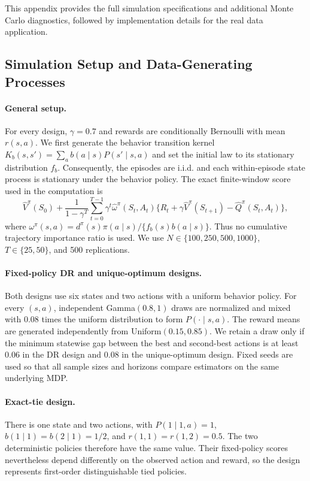 \documentclass[12pt]{article}
\theoremstyle{remark}\newtheorem{remark}[theorem]{Remark}\theoremstyle{plain}
\begin{document}
This appendix provides the full simulation specifications and additional
Monte Carlo diagnostics, followed by implementation details for the real
data application.

\subsection{Simulation Setup and Data-Generating Processes}\label{sec:sim_setup}

\paragraph{General setup.}
For every design, $\gamma=0.7$ and rewards are conditionally Bernoulli
with mean $r(s,a)$.  We first generate the behavior transition kernel
$K_b(s,s')=\sum_a b(a\mid s)P(s'\mid s,a)$ and set the initial law to its
stationary distribution $f_b$.  Consequently, the episodes are i.i.d. and
each within-episode state process is stationary under the behavior policy.
The exact finite-window score used in the computation is
\[
 \widehat V^\pi(S_0)
 +\frac{1}{1-\gamma^T}\sum_{t=0}^{T-1}\gamma^t
 \widehat\omega^\pi(S_t,A_t)
 \{R_t+\gamma\widehat V^\pi(S_{t+1})
                    -\widehat Q^\pi(S_t,A_t)\},
\]
where
$\omega^\pi(s,a)=d^\pi(s)\pi(a\mid s)/\{f_b(s)b(a\mid s)\}$.
Thus no cumulative trajectory importance ratio is used.  We use
$N\in\{100,250,500,1000\}$, $T\in\{25,50\}$, and 500 replications.

\paragraph{Fixed-policy DR and unique-optimum designs.}
Both designs use six states and two actions with a uniform behavior policy.
For every $(s,a)$, independent Gamma$(0.8,1)$ draws are normalized and mixed
with 0.08 times the uniform distribution to form $P(\cdot\mid s,a)$.
The reward means are generated independently from
Uniform$(0.15,0.85)$.  We retain a draw only if the minimum statewise gap
between the best and second-best actions is at least 0.06 in the DR design
and 0.08 in the unique-optimum design.  Fixed seeds are used so that all
sample sizes and horizons compare estimators on the same underlying MDP.

\paragraph{Exact-tie design.}
There is one state and two actions, with
$P(1\mid1,a)=1$, $b(1\mid1)=b(2\mid1)=1/2$, and
$r(1,1)=r(1,2)=0.5$.  The two deterministic policies therefore have the
same value.  Their fixed-policy scores nevertheless depend differently on
the observed action and reward, so the design represents
first-order distinguishable tied policies.
\end{document}
